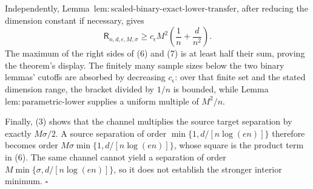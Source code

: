 Independently, Lemma~\(\mathrm{lem:scaled\text{-}binary\text{-}exact\text{-}lower\text{-}transfer}\), after reducing the dimension constant if necessary, gives
\[
 \mathsf R_{n,d,\epsilon,M,\sigma}
 \ge c_{\epsilon}M^2\left(\frac1n+\frac d{n^2}\right).
\tag{7}
\]
The maximum of the right sides of (6) and (7) is at least half their sum, proving the theorem's display.  The finitely many sample sizes below the two binary lemmas' cutoffs are absorbed by decreasing \(c_{\epsilon}\): over that finite set and the stated dimension range, the bracket divided by \(1/n\) is bounded, while Lemma~\(\mathrm{lem:parametric\text{-}lower}\) supplies a uniform multiple of \(M^2/n\).

Finally, (3) shows that the channel multiplies the source target separation by exactly \(M\sigma/2\).  A source separation of order \(\min\{1,d/[n\log(en)]\}\) therefore becomes order \(M\sigma\min\{1,d/[n\log(en)]\}\), whose square is the product term in (6).  The same channel cannot yield a separation of order \(M\min\{\sigma,d/[n\log(en)]\}\), so it does not establish the stronger interior minimum. \(\square\)